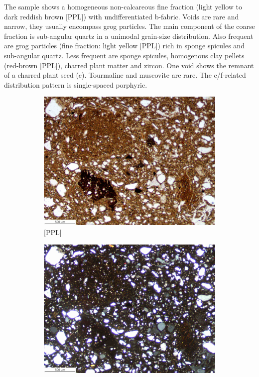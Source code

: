 \documentclass[a4paper]{article}
\begin{document}
\begin{multicols}{2}
\noindent The sample shows a homogeneous non-calcareous fine fraction (light yellow to dark reddish brown [PPL]) with undifferentiated b-fabric. Voids are rare and narrow, they usually encompass grog particles. The main component of the coarse fraction is sub-angular quartz in a unimodal grain-size distribution. Also frequent are grog particles (fine fraction: light yellow [PPL]) rich in sponge spicules and sub-angular quartz. Less frequent are sponge spicules, homogenous clay pellets (red-brown [PPL]), charred plant matter and zircon. One void shows the remnant of a charred plant seed (c). Tourmaline and muscovite are rare. The c/f-related distribution pattern is single-spaced porphyric.
\end{multicols}

\begin{figure}[H]
	\centering
	\begin{subfigure}[t]{.49\textwidth}
		\includegraphics[width=\textwidth]{ThinSections/51-3_4x_PPL.jpg}
		\caption{[PPL]}
	\end{subfigure}\hspace{.5em}\hfill
	\begin{subfigure}[t]{.49\textwidth}
		\includegraphics[width=\textwidth]{ThinSections/51-3_4x_XPL.jpg}

\end{subfigure}
\end{figure}
\end{document}
